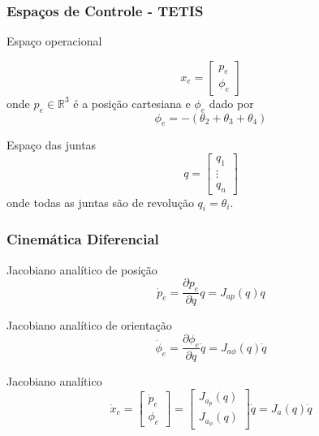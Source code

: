 \documentclass{beamer}
\newcommand\m[1]{\begin{bmatrix}#1\end{bmatrix}}
\begin{document}
\begin{frame}
\frametitle{Espaços de Controle - TETIS}

\begin{block}{Espaço operacional}

\begin{equation} \label{eq:operational_space}
{x_e} = \m{{p}_e \\ \phi_e}
\end{equation}
onde ${p}_e \in \mathbb{R}^3$ é a posição cartesiana e ${\phi}_e$ dado por
\begin{equation} \label{eq:orientacao} %
\phi_e = -(\theta_2 + \theta_3 + \theta_4)
\end{equation}
\end{block}

\begin{block}{Espaço das juntas}
\begin{equation} \label{eq:joint_space}
{q} = \m{q_1 \\ \vdots \\ q_n}
\end{equation} 
onde todas as juntas são de revolução $q_i = \theta_i$.
\end{block}
\end{frame}

\begin{frame}
\frametitle{Cinemática Diferencial}
\begin{block}{Jacobiano analítico de posição}
\begin{equation} \label{eq:jacob_pos}
\dot{{p}}_e = \frac{\partial {p}_e }{\partial {q}} {{q}} = {J}_{ap} ({q}) {{q}} 
\end{equation}
\end{block}

\begin{block}{Jacobiano analítico de orientação}
\begin{equation} \label{eq:jacob_or}
\dot{{\phi}}_e = \frac{\partial {\phi}_e}{\partial {q}} {\dot{q}} = {J}_{a\phi}({q}){\dot{q}}
\end{equation}
\end{block}

\begin{block}{Jacobiano analítico}
\begin{equation} \label{eq:jacoba}
\dot{x}_e = \m{ \dot{p}_e \\ \phi_e } = \m{ J_{a_p}(q) \\ J_{a_\phi}(q)} {\dot{q}} = {J}_a ({q}) \dot{{q}}
\end{equation}
\end{block}
\end{frame}
\end{document}
